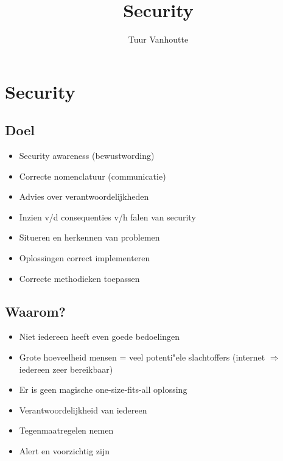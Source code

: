 \documentclass{article}
\begin{document}
\begin{titlepage}
    \author{Tuur Vanhoutte}
    \title{Security}
\end{titlepage}

\maketitle
\newpage
\tableofcontents
\newpage


\section{Security}

\subsection{Doel}
\begin{itemize}
    \item Security awareness  (bewustwording)
    \item Correcte nomenclatuur (communicatie)
    \item Advies over verantwoordelijkheden
    \item Inzien v/d consequenties v/h falen van security
    \item Situeren en herkennen van problemen
    \item Oplossingen correct implementeren
    \item Correcte methodieken toepassen
\end{itemize}

\subsection{Waarom?}

\begin{itemize}
    \item Niet iedereen heeft even goede bedoelingen
    \item Grote hoeveelheid mensen = veel potenti"ele slachtoffers (internet $\Rightarrow$ iedereen zeer bereikbaar)
    \item Er is geen magische one-size-fits-all oplossing
    \item Verantwoordelijkheid van iedereen
    \item Tegenmaatregelen nemen
    \item Alert en voorzichtig zijn
\end{itemize}
\end{document}
